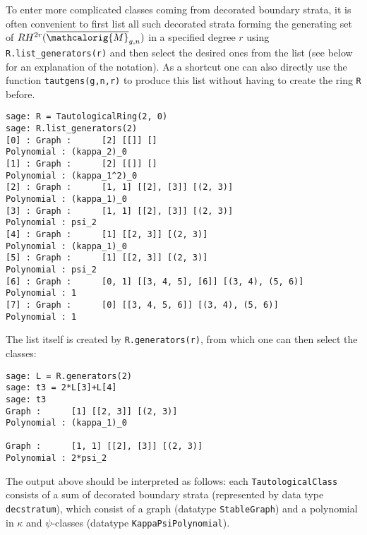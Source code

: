 \documentclass[11pt]{article}
\newcommand{\M}{\ensuremath{\overline{\mathcalorig{M}}}}
\begin{document}
To enter more complicated classes coming from decorated boundary strata, it is often convenient to first list all such decorated strata forming the generating set of $RH^{2r}(\M_{g,n})$  in a specified degree $r$ using \verb|R.list_generators(r)| and then select the desired ones from the list (see below for an explanation of the notation). As a shortcut one can also directly use the function \texttt{tautgens(g,n,r)} to produce this list without having to create the ring \texttt{R} before.
\begin{lstlisting}
sage: R = TautologicalRing(2, 0)
sage: R.list_generators(2)
[0] : Graph :      [2] [[]] []
Polynomial : (kappa_2)_0
[1] : Graph :      [2] [[]] []
Polynomial : (kappa_1^2)_0
[2] : Graph :      [1, 1] [[2], [3]] [(2, 3)]
Polynomial : (kappa_1)_0
[3] : Graph :      [1, 1] [[2], [3]] [(2, 3)]
Polynomial : psi_2
[4] : Graph :      [1] [[2, 3]] [(2, 3)]
Polynomial : (kappa_1)_0
[5] : Graph :      [1] [[2, 3]] [(2, 3)]
Polynomial : psi_2
[6] : Graph :      [0, 1] [[3, 4, 5], [6]] [(3, 4), (5, 6)]
Polynomial : 1
[7] : Graph :      [0] [[3, 4, 5, 6]] [(3, 4), (5, 6)]
Polynomial : 1
\end{lstlisting}
The list itself is created by \verb|R.generators(r)|, from which one can then select the classes:
\begin{lstlisting}
sage: L = R.generators(2)
sage: t3 = 2*L[3]+L[4]
sage: t3
Graph :      [1] [[2, 3]] [(2, 3)]
Polynomial : (kappa_1)_0

Graph :      [1, 1] [[2], [3]] [(2, 3)]
Polynomial : 2*psi_2
\end{lstlisting}
The output above should be interpreted as follows: each \verb|TautologicalClass| consists of a sum of decorated boundary strata (represented by data type \verb|decstratum|), which consist of a graph (datatype \verb|StableGraph|) and a polynomial in $\kappa$ and $\psi$-classes (datatype \verb|KappaPsiPolynomial|).

\end{document}

